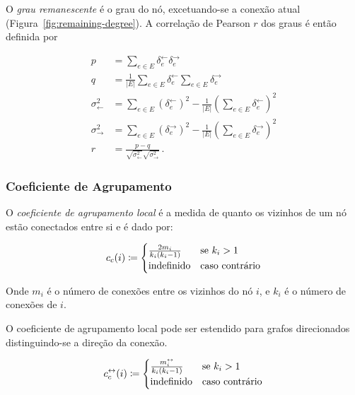 \documentclass[12pt,a4paper]{article}
\begin{document}
O \textit{grau remanescente} é o grau do nó, excetuando-se a conexão atual (Figura~\ref{fig:remaining-degree}). A correlação de Pearson $r$ dos graus é então definida por

\begin{align*}
p &= \sum_{e \in E} \delta_e^\leftarrow \delta_e^\rightarrow
\\
q &= \frac{1}{|E|} \sum_{e \in E} \delta_e^\leftarrow
\sum_{e \in E }\delta_e^\rightarrow
\\
\sigma^2_\leftarrow &= \sum_{e \in E} \left( \delta_e^\leftarrow \right)^2
- \frac{1}{|E|} \left( \sum_{e \in E} \delta_e^\leftarrow \right)^2
\\
\sigma^2_\rightarrow &= \sum_{e \in E} \left( \delta_e^\rightarrow \right)^2
- \frac{1}{|E|} \left( \sum_{e \in E} \delta_e^\rightarrow \right)^2
\\
r &= \frac{p - q}
{\sqrt{ \sigma^2_\leftarrow } \sqrt{ \sigma^2_\rightarrow }}\,.
\end{align*}

\subsubsection{Coeficiente de Agrupamento} \label{sec:coeficiente-agrupamento}

O \textit{coeficiente de agrupamento local} é a medida de quanto os vizinhos de um nó estão conectados entre si e é dado por:

\begin{equation}
c_c(i) \coloneqq \begin{cases}
    \frac{2m_i}{k_i(k_i - 1)} & \text{se}\ k_i > 1 \\
    \text{indefinido}         & \text{caso contrário}
  \end{cases}
\end{equation}

Onde $m_i$ é o número de conexões entre os vizinhos do nó $i$, e $k_i$ é o número de conexões de $i$.

O coeficiente de agrupamento local pode ser estendido para grafos direcionados distinguindo-se a direção da conexão.

\begin{equation}
c^\leftrightarrow_c(i) \coloneqq \begin{cases}
    \frac{m^\leftrightarrow_i}{k_i(k_i - 1)} & \text{se}\ k_i > 1 \\
    \text{indefinido}                  & \text{caso contrário}
  \end{cases}
\end{equation}
\end{document}
